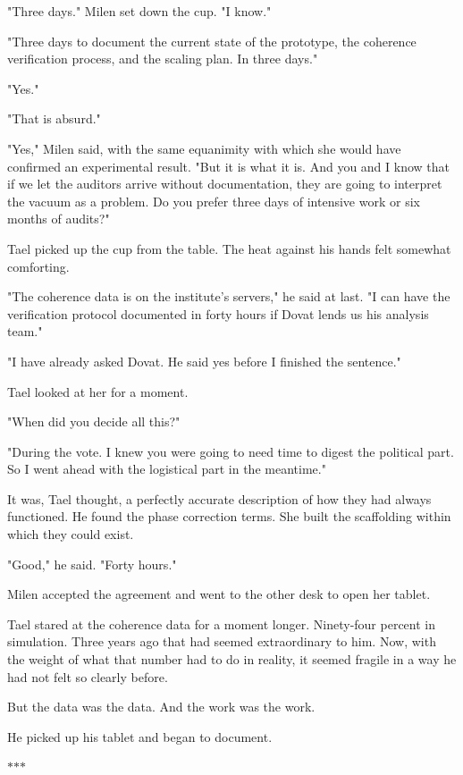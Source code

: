 \documentclass[11pt,a5paper,twoside]{book}
\begin{document}
"Three days." Milen set down the cup. "I know."

"Three days to document the current state of the prototype, the coherence verification process, and the scaling plan. In three days."

"Yes."

"That is absurd."

"Yes," Milen said, with the same equanimity with which she would have confirmed an experimental result. "But it is what it is. And you and I know that if we let the auditors arrive without documentation, they are going to interpret the vacuum as a problem. Do you prefer three days of intensive work or six months of audits?"

Tael picked up the cup from the table. The heat against his hands felt somewhat comforting.

"The coherence data is on the institute's servers," he said at last. "I can have the verification protocol documented in forty hours if Dovat lends us his analysis team."

"I have already asked Dovat. He said yes before I finished the sentence."

Tael looked at her for a moment.

"When did you decide all this?"

"During the vote. I knew you were going to need time to digest the political part. So I went ahead with the logistical part in the meantime."

It was, Tael thought, a perfectly accurate description of how they had always functioned. He found the phase correction terms. She built the scaffolding within which they could exist.

"Good," he said. "Forty hours."

Milen accepted the agreement and went to the other desk to open her tablet.

Tael stared at the coherence data for a moment longer. Ninety-four percent in simulation. Three years ago that had seemed extraordinary to him. Now, with the weight of what that number had to do in reality, it seemed fragile in a way he had not felt so clearly before.

But the data was the data. And the work was the work.

He picked up his tablet and began to document.

\vspace{1.5em}
\begin{center}$\ast$\quad$\ast$\quad$\ast$\end{center}
\vspace{1.5em}
\end{document}
